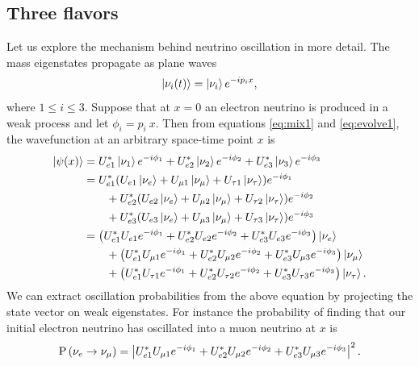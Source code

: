 \subsection{Three flavors}
Let us explore the mechanism behind neutrino oscillation in more detail.
The mass eigenstates propagate as plane waves
\begin{equation}
  \label{eq:evolve1}
  \ket{\nu_i(t)}=\ket{\nu_i}e^{-ip_ix},
\end{equation}
where $1\leq i\leq3$. Suppose that at $x=0$ an electron neutrino
is produced in a weak process and let $\phi_i=p_i~x$. Then from equations
\eqref{eq:mix1} and \eqref{eq:evolve1}, the wavefunction at an arbitrary
space-time point $x$ is
\begin{equation}
  \begin{aligned}
    \ket{\psi(x)}&=U_{e1}^*\ket{\nu_1}e^{-i\phi_1}
                  +U_{e2}^*\ket{\nu_2}e^{-i\phi_2}
                  +U_{e3}^*\ket{\nu_3}e^{-i\phi_3} \\
                 &=U_{e1}^*(U_{e1}\ket{\nu_e}+U_{\mu 1}\ket{\nu_\mu}
                   +U_{\tau 1}\ket{\nu_\tau})e^{-i\phi_1} \\
                 &~~~~~~
                  +U_{e2}^*(U_{e2}\ket{\nu_e}+U_{\mu 2}\ket{\nu_\mu}
                   +U_{\tau 2}\ket{\nu_\tau})e^{-i\phi_2} \\
                 &~~~~~~
                  +U_{e3}^*(U_{e3}\ket{\nu_e}+U_{\mu 3}\ket{\nu_\mu}
                   +U_{\tau 3}\ket{\nu_\tau})e^{-i\phi_3} \\
                 &=\left(U_{e1}^*U_{e1}e^{-i\phi_1}
                    +U_{e2}^*U_{e2}e^{-i\phi_2}
                    +U_{e3}^*U_{e3}e^{-i\phi_3}\right)\ket{\nu_e} \\
                 &~~~~~~
                   +\left(U_{e1}^*U_{\mu 1}e^{-i\phi_1}
                    +U_{e2}^*U_{\mu 2}e^{-i\phi_2}
                    +U_{e3}^*U_{\mu 3}e^{-i\phi_3}\right)\ket{\nu_\mu} \\
                 &~~~~~~
                   +\left(U_{e1}^*U_{\tau 1}e^{-i\phi_1}
                    +U_{e2}^*U_{\tau 2}e^{-i\phi_2}
                    +U_{e3}^*U_{\tau 3}e^{-i\phi_3}\right)\ket{\nu_\tau}.
  \end{aligned}
\end{equation}
We can extract oscillation probabilities from the above equation by projecting
the state vector on weak eigenstates. For instance the probability of finding
that our initial electron neutrino has oscillated into a muon neutrino at $x$ is
\begin{equation}
  \operatorname{P}\left(\nu_e\to\nu_\mu\right)=\left|U_{e1}^*U_{\mu 1}e^{-i\phi_1}
                    +U_{e2}^*U_{\mu 2}e^{-i\phi_2}
                    +U_{e3}^*U_{\mu 3}e^{-i\phi_3}\right|^2.
\end{equation}
